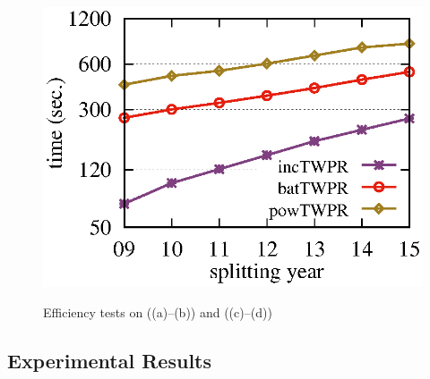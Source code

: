 \begin{figure}[tb!]
\begin{center}
{\includegraphics[scale=\graphscale]{./exp/MAG_time_twpr.eps}}
\hspace{0ex}
{}
\end{center}
\vspace{-2.5ex}
\caption{\small Efficiency tests on \aminer ((a)--(b)) and  \magdata ((c)--(d))}
\label{exp-time}
\vspace{-3ex}
\end{figure}

\subsection{Experimental Results}
\label{subsec-expres}

